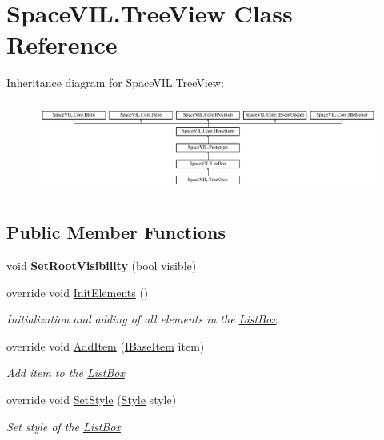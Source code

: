 \hypertarget{class_space_v_i_l_1_1_tree_view}{}\section{Space\+V\+I\+L.\+Tree\+View Class Reference}
\label{class_space_v_i_l_1_1_tree_view}
Inheritance diagram for Space\+V\+I\+L.\+Tree\+View\+:\begin{figure}[H]
\begin{center}
\leavevmode
\includegraphics[height=3.027027cm]{class_space_v_i_l_1_1_tree_view}
\end{center}
\end{figure}
\subsection*{Public Member Functions}
\begin{DoxyCompactItemize}
\item 
\mbox{\label{class_space_v_i_l_1_1_tree_view_a68f63833eaa2ae522b123247df082c8b}} 
void {\bfseries Set\+Root\+Visibility} (bool visible)
\item 
override void \mbox{\hyperlink{class_space_v_i_l_1_1_tree_view_ac44a1df7d58a35e35842170162645e08}{Init\+Elements}} ()
\begin{DoxyCompactList}\small\item\em Initialization and adding of all elements in the \mbox{\hyperlink{class_space_v_i_l_1_1_list_box}{List\+Box}} \end{DoxyCompactList}\item 
override void \mbox{\hyperlink{class_space_v_i_l_1_1_tree_view_ab810906945c91dc1db571b446ea2f6a0}{Add\+Item}} (\mbox{\hyperlink{interface_space_v_i_l_1_1_core_1_1_i_base_item}{I\+Base\+Item}} item)
\begin{DoxyCompactList}\small\item\em Add item to the \mbox{\hyperlink{class_space_v_i_l_1_1_list_box}{List\+Box}} \end{DoxyCompactList}\item 
override void \mbox{\hyperlink{class_space_v_i_l_1_1_tree_view_aac5935163cddb3e34bcef8ee112ae1dd}{Set\+Style}} (\mbox{\hyperlink{class_space_v_i_l_1_1_decorations_1_1_style}{Style}} style)
\begin{DoxyCompactList}\small\item\em Set style of the \mbox{\hyperlink{class_space_v_i_l_1_1_list_box}{List\+Box}} \end{DoxyCompactList}\end{DoxyCompactItemize}
